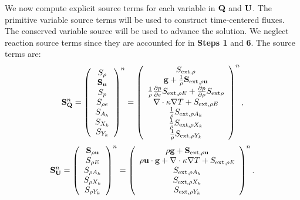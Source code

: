 \begin{enumerate}
We now compute explicit source terms for each variable in ${\bf Q}$ and
${\bf U}$.  The primitive variable source terms will be used to construct
time-centered fluxes.  The conserved variable source will be used to
advance the solution.  We neglect reaction source terms since they are
accounted for in {\bf Steps 1} and {\bf 6}.  The source terms are:
\begin{equation}
{\bf S}_{{\bf Q}}^n =
\left(\begin{array}{c}
S_\rho \\
{\bf S}_{{\bf u}} \\
S_p \\
S_{\rho e} \\
S_{A_k} \\
S_{X_k} \\
S_{Y_k}
\end{array}\right)^n
=
\left(\begin{array}{c}
S_{{\rm ext},\rho} \\
{\bf g} + \frac{1}{\rho}{\bf S}_{{\rm ext},\rho{\bf u}} \\
\frac{1}{\rho}\frac{\partial p}{\partial e}S_{{\rm ext},\rho E} + \frac{\partial p}{\partial\rho}S_{{\rm ext}\rho} \\
\nabla\cdot\kappa\nabla T + S_{{\rm ext},\rho E} \\
\frac{1}{\rho}S_{{\rm ext},\rho A_k} \\
\frac{1}{\rho}S_{{\rm ext},\rho X_k} \\
\frac{1}{\rho}S_{{\rm ext},\rho Y_k}
\end{array}\right)^n,
\end{equation}
\begin{equation}
{\bf S}_{{\bf U}}^n =
\left(\begin{array}{c}
{\bf S}_{\rho{\bf u}} \\
S_{\rho E} \\
S_{\rho A_k} \\
S_{\rho X_k} \\
S_{\rho Y_k}
\end{array}\right)^n
=
\left(\begin{array}{c}
\rho {\bf g} + {\bf S}_{{\rm ext},\rho{\bf u}} \\
\rho {\bf u} \cdot {\bf g} + \nabla\cdot\kappa\nabla T + S_{{\rm ext},\rho E} \\
S_{{\rm ext},\rho A_k} \\
S_{{\rm ext},\rho X_k} \\
S_{{\rm ext},\rho Y_k}
\end{array}\right)^n.
\end{equation}


\end{enumerate}
